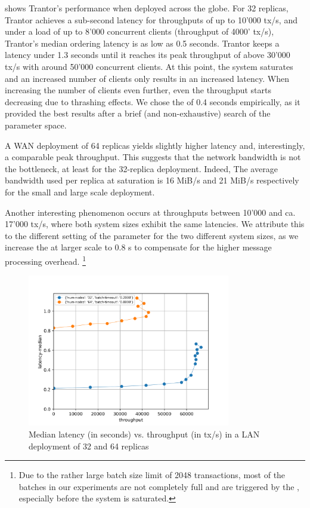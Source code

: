 \documentclass{article}
\begin{document}
 shows Trantor's performance when deployed across the globe.
For 32 replicas, Trantor achieves a sub-second latency for throughputs of up to 10'000 tx/s,
and under a load of up to 8'000 concurrent clients (throughput of 4000' tx/s), Trantor's median ordering latency is as low as 0.5 seconds.
Trantor keeps a latency under 1.3 seconds until it reaches its peak throughput of above 30'000 tx/s with around 50'000 concurrent clients.
At this point, the system saturates and an increased number of clients only results in an increased latency.
When increasing the number of clients even further, even the throughput starts decreasing due to thrashing effects.
We chose the  of 0.4 seconds empirically,
as it provided the best results after a brief (and non-exhaustive) search of the parameter space.

A WAN deployment of 64 replicas yields slightly higher latency and, interestingly, a comparable peak throughput.
This suggests that the network bandwidth is not the bottleneck, at least for the 32-replica deployment.
Indeed, The average bandwidth used per replica at saturation is 16 MiB/s and 21 MiB/s respectively for the small and large scale deployment.

Another interesting phenomenon occurs at throughputs between 10'000 and ca. 17'000 tx/s, where both system sizes exhibit the same latencies.
We attribute this to the different setting of the  parameter for the two different system sizes,
as we increase the  at larger scale to 0.8 s to compensate for the higher message processing overhead.%
\footnote{Due to the rather large batch size limit of 2048 transactions,
most of the batches in our experiments are not completely full and are triggered by the , especially before the system is saturated.}

\begin{figure}
    \centering
    \includegraphics[width=0.79\textwidth]{figures/results-lan-final.png}
    \caption{\centering Median latency (in seconds) vs. throughput (in tx/s)
    in a LAN deployment of 32 and 64 replicas}
    \label{fig:eval-lan}
\end{figure}
\end{document}
